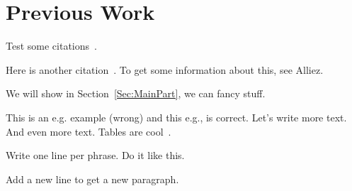 \section{Previous Work}\label{sec:PreviousWork}
Test some citations~\cite{Alliez03RAC,Peng05T3M,Maglo153MC}.

Here is another citation~\cite[p. 34]{Mlakar24EEC}.
To get some information about this, see Alliez.~\cite{Alliez03RAC}

We will show in Section~\ref{Sec:MainPart}, we can fancy stuff.

This is an e.g. example (wrong) and this e.g., is correct.
Let's write more text. 
And even more text. 
Tables are cool~\cite[p. 34]{Mlakar24EEC}. 

Write one line per phrase.
Do it like this.

Add a new line to get a new paragraph.